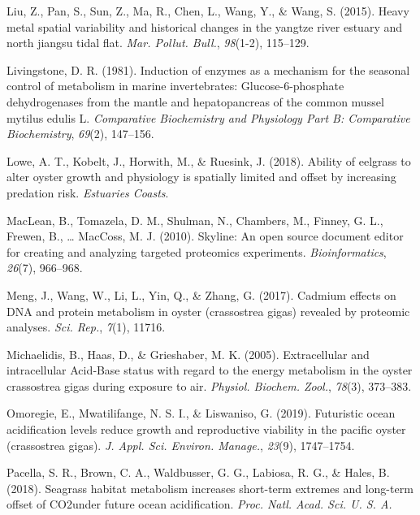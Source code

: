 \documentclass [11pt, proquest] {uwthesis}[2015/03/03]
\newlength{\cslhangindent}
\newenvironment{CSLReferences}%
{\setlength{\parindent}{0pt}%
\everypar{\setlength{\hangindent}{\cslhangindent}}\ignorespaces}%
{\par}
\begin{document}
\begin{CSLReferences}{1}{0}
\leavevmode\hypertarget{ref-Liu2015}{}%
Liu, Z., Pan, S., Sun, Z., Ma, R., Chen, L., Wang, Y., \& Wang, S. (2015). Heavy metal spatial variability and historical changes in the yangtze river estuary and north jiangsu tidal flat. \emph{Mar. Pollut. Bull.}, \emph{98}(1-2), 115--129.

\leavevmode\hypertarget{ref-Livingstone1981}{}%
Livingstone, D. R. (1981). Induction of enzymes as a mechanism for the seasonal control of metabolism in marine invertebrates: Glucose-6-phosphate dehydrogenases from the mantle and hepatopancreas of the common mussel mytilus edulis {L}. \emph{Comparative Biochemistry and Physiology Part B: Comparative Biochemistry}, \emph{69}(2), 147--156.

\leavevmode\hypertarget{ref-Lowe2018}{}%
Lowe, A. T., Kobelt, J., Horwith, M., \& Ruesink, J. (2018). Ability of eelgrass to alter oyster growth and physiology is spatially limited and offset by increasing predation risk. \emph{Estuaries Coasts}.

\leavevmode\hypertarget{ref-MacLean2010}{}%
MacLean, B., Tomazela, D. M., Shulman, N., Chambers, M., Finney, G. L., Frewen, B., \ldots{} MacCoss, M. J. (2010). Skyline: An open source document editor for creating and analyzing targeted proteomics experiments. \emph{Bioinformatics}, \emph{26}(7), 966--968.

\leavevmode\hypertarget{ref-Meng2017}{}%
Meng, J., Wang, W., Li, L., Yin, Q., \& Zhang, G. (2017). Cadmium effects on {DNA} and protein metabolism in oyster (crassostrea gigas) revealed by proteomic analyses. \emph{Sci. Rep.}, \emph{7}(1), 11716.

\leavevmode\hypertarget{ref-Michaelidis2005}{}%
Michaelidis, B., Haas, D., \& Grieshaber, M. K. (2005). Extracellular and intracellular {Acid‐Base} status with regard to the energy metabolism in the oyster crassostrea gigas during exposure to air. \emph{Physiol. Biochem. Zool.}, \emph{78}(3), 373--383.

\leavevmode\hypertarget{ref-Omoregie2019}{}%
Omoregie, E., Mwatilifange, N. S. I., \& Liswaniso, G. (2019). Futuristic ocean acidification levels reduce growth and reproductive viability in the pacific oyster (crassostrea gigas). \emph{J. Appl. Sci. Environ. Manage.}, \emph{23}(9), 1747--1754.

\leavevmode\hypertarget{ref-Pacella2018}{}%
Pacella, S. R., Brown, C. A., Waldbusser, G. G., Labiosa, R. G., \& Hales, B. (2018). Seagrass habitat metabolism increases short-term extremes and long-term offset of {CO2under} future ocean acidification. \emph{Proc. Natl. Acad. Sci. U. S. A.}


\end{CSLReferences}
\end{document}
